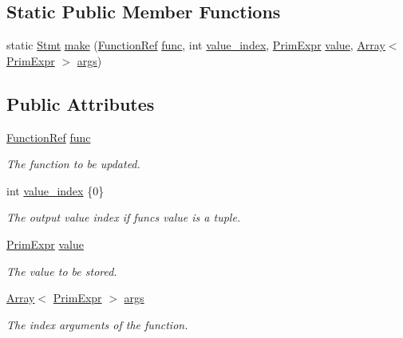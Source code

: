 \subsection*{Static Public Member Functions}
\begin{DoxyCompactItemize}
\item 
static \hyperlink{classtvm_1_1tir_1_1Stmt}{Stmt} \hyperlink{classtvm_1_1tir_1_1ProvideNode_a3445989acfb8a019e9d9d3dc146372d7}{make} (\hyperlink{classtvm_1_1tir_1_1FunctionRef}{Function\+Ref} \hyperlink{classtvm_1_1tir_1_1ProvideNode_ae733ea7142d3c2823a60bdb3bd9b8f3c}{func}, int \hyperlink{classtvm_1_1tir_1_1ProvideNode_a043817fe37e1d7b5937b549621cb101d}{value\+\_\+index}, \hyperlink{classtvm_1_1PrimExpr}{Prim\+Expr} \hyperlink{classtvm_1_1tir_1_1ProvideNode_a8ea72dcf6b347c0f19ba53fb6f7aa934}{value}, \hyperlink{classtvm_1_1Array}{Array}$<$ \hyperlink{classtvm_1_1PrimExpr}{Prim\+Expr} $>$ \hyperlink{classtvm_1_1tir_1_1ProvideNode_a595dcef23f7615e871bd8f5052db6626}{args})
\end{DoxyCompactItemize}
\subsection*{Public Attributes}
\begin{DoxyCompactItemize}
\item 
\hyperlink{classtvm_1_1tir_1_1FunctionRef}{Function\+Ref} \hyperlink{classtvm_1_1tir_1_1ProvideNode_ae733ea7142d3c2823a60bdb3bd9b8f3c}{func}
\begin{DoxyCompactList}\small\item\em The function to be updated. \end{DoxyCompactList}\item 
int \hyperlink{classtvm_1_1tir_1_1ProvideNode_a043817fe37e1d7b5937b549621cb101d}{value\+\_\+index} \{0\}
\begin{DoxyCompactList}\small\item\em The output value index if func\textquotesingle{}s value is a tuple. \end{DoxyCompactList}\item 
\hyperlink{classtvm_1_1PrimExpr}{Prim\+Expr} \hyperlink{classtvm_1_1tir_1_1ProvideNode_a8ea72dcf6b347c0f19ba53fb6f7aa934}{value}
\begin{DoxyCompactList}\small\item\em The value to be stored. \end{DoxyCompactList}\item 
\hyperlink{classtvm_1_1Array}{Array}$<$ \hyperlink{classtvm_1_1PrimExpr}{Prim\+Expr} $>$ \hyperlink{classtvm_1_1tir_1_1ProvideNode_a595dcef23f7615e871bd8f5052db6626}{args}
\begin{DoxyCompactList}\small\item\em The index arguments of the function. \end{DoxyCompactList}\end{DoxyCompactItemize}
